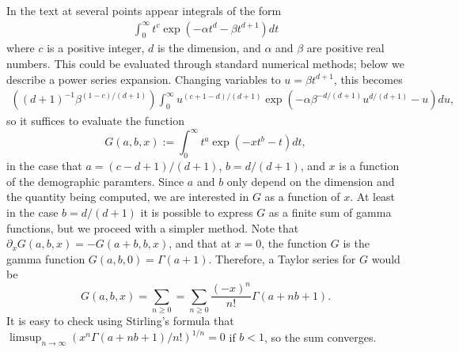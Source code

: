 \documentclass{article}
\begin{document}
In the text at several points appear integrals of the form
\begin{align}
  \int_0^\infty t^c \exp \left( - \alpha t^d - \beta t^{d+1} \right) dt 
\end{align}
where $c$ is a positive integer, $d$ is the dimension, and $\alpha$ and $\beta$ are positive real numbers.
This could be evaluated through standard numerical methods; below we describe a power series expansion.
Changing variables to $u = \beta t^{d+1}$, this becomes
\begin{align}
    \left( (d+1)^{-1} \beta^{ (1-c)/(d+1) } \right) \int_0^\infty u^{(c+1-d)/(d+1)} \exp\left( - \alpha \beta^{-d/(d+1)} u^{d/(d+1)} - u \right) du ,
\end{align}
so it suffices to evaluate the function
\begin{equation}
    G(a,b,x) := \int_0^\infty  t^a \exp\left( -x t^b - t \right) dt ,
\end{equation}
in the case that $a=(c-d+1)/(d+1)$, $b=d/(d+1)$, and $x$ is a function of the demographic paramters.
Since $a$ and $b$ only depend on the dimension and the quantity being computed,
we are interested in $G$ as a function of $x$.
At least in the case $b=d/(d+1)$ it is possible to express $G$ as a finite sum of gamma functions,
but we proceed with a simpler method.
Note that $\partial_x G(a,b,x) = -G(a+b,b,x)$,
and that at $x=0$, the function $G$ is the gamma function $G(a,b,0) = \Gamma(a+1)$.
Therefore, a Taylor series for $G$ would be
\[
    G(a,b,x) = \sum_{n \ge 0} = \sum_{n \ge 0} \frac{(-x)^n}{n!} \Gamma(a+nb+1) .
\]
It is easy to check using Stirling's formula that $\limsup_{n \to \infty} ( x^n \Gamma(a+nb+1)/n! )^{1/n} = 0$
if $b<1$, so the sum converges.
\end{document}
